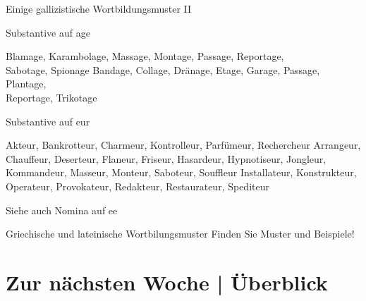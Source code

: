 \begin{frame}
  {Einige gallizistische Wortbildungsmuster II}
  \onslide<+->
  \onslide<+->
  \begin{exe}
    \ex \alert{Substantive auf age}
    \begin{xlist}
      \ex \small Blamage, Karambolage, Massage, Montage, Passage, Reportage,\\
      Sabotage, Spionage
      \ex \small Bandage, Collage, Dränage, Etage, Garage, Passage, Plantage,\\
      Reportage, Trikotage
    \end{xlist}
    \onslide<+->
    \ex \alert{Substantive auf eur}
    \begin{xlist}
      \ex \small Akteur, Bankrotteur, Charmeur, Kontrolleur, Parfümeur, Rechercheur
      \ex \small Arrangeur, Chauffeur, Deserteur, Flaneur, Friseur, Hasardeur, Hypnotiseur, Jongleur, Kommandeur, Masseur, Monteur, Saboteur, Souffleur
      \ex \small Installateur, Konstrukteur, Operateur, Provokateur, Redakteur, Restaurateur, Spediteur
    \end{xlist}
  \end{exe}
  \onslide<+->
  \Viertelzeile
  Siehe auch Nomina auf \alert{ee}
\end{frame}

\begin{frame}
  {Griechische und lateinische Wortbilungsmuster}
  \onslide<+->
  \onslide<+->
  \Zeile
  Finden Sie Muster und Beispiele!
\end{frame}

\section{Zur nächsten Woche | Überblick}

